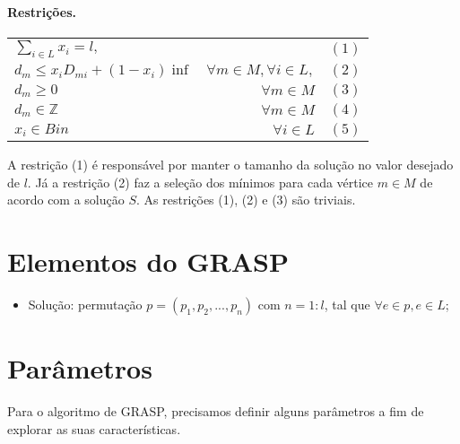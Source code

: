 \documentclass[12pt]{article}
\begin{document}
\paragraph{Restrições.}
\begin{table}[htb]
\setlength{\tabcolsep}{20pt}
\centering
\label{my-label}
\begin{tabular}{lrl}
$\sum_{i \in L}x_i = l,$                       & \multicolumn{1}{l}{}                & $(1)$  \\
$d_m \leq x_i D_{mi} + (1-x_i)\inf $           & $\forall m \in M, \forall i \in L,$ & $(2)$ \\
$d_m \geq 0$                                   & $\forall m \in M$                   & $(3)$ \\
$d_m \in \mathbb{Z} $                                    & $\forall m \in M$                   & $(4)$ \\
$x_i \in Bin$                                  & $\forall i \in L$                   & $(5)$
\end{tabular}
\end{table}

A restrição (1) é responsável por manter o tamanho da solução no valor desejado de $l$. Já a restrição (2) faz a seleção dos mínimos para cada vértice $m \in M$ de acordo com a solução $S$. As restrições (1), (2) e (3) são triviais.

\section{Elementos do GRASP}

\begin{itemize}
\item Solução: permutação $p = (p_1, p_2, ..., p_n)$ com $n=1:l$, tal que  $ \forall e \in p, e\in L $;
\end{itemize}

\section{Parâmetros}

Para o algoritmo de GRASP, precisamos definir alguns parâmetros a fim de explorar as suas características. 
\end{document}
